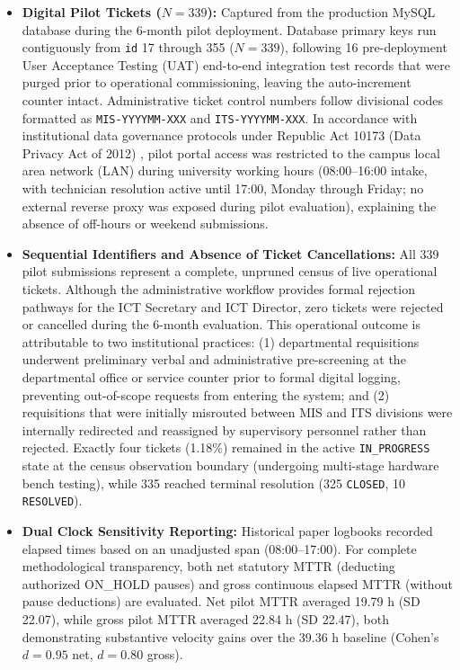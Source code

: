 \documentclass[conference]{IEEEtran}
\begin{document}
\begin{itemize}
    \item \textbf{Digital Pilot Tickets ($N = 339$):} Captured from the production MySQL database during the 6-month pilot deployment. Database primary keys run contiguously from \texttt{id} 17 through 355 ($N=339$), following 16 pre-deployment User Acceptance Testing (UAT) end-to-end integration test records that were purged prior to operational commissioning, leaving the auto-increment counter intact. Administrative ticket control numbers follow divisional codes formatted as \texttt{MIS-YYYYMM-XXX} and \texttt{ITS-YYYYMM-XXX}. In accordance with institutional data governance protocols under Republic Act 10173 (Data Privacy Act of 2012) \cite{ref28}, pilot portal access was restricted to the campus local area network (LAN) during university working hours (08:00--16:00 intake, with technician resolution active until 17:00, Monday through Friday; no external reverse proxy was exposed during pilot evaluation), explaining the absence of off-hours or weekend submissions.
    \item \textbf{Sequential Identifiers and Absence of Ticket Cancellations:} All 339 pilot submissions represent a complete, unpruned census of live operational tickets. Although the administrative workflow provides formal rejection pathways for the ICT Secretary and ICT Director, zero tickets were rejected or cancelled during the 6-month evaluation. This operational outcome is attributable to two institutional practices: (1) departmental requisitions underwent preliminary verbal and administrative pre-screening at the departmental office or service counter prior to formal digital logging, preventing out-of-scope requests from entering the system; and (2) requisitions that were initially misrouted between MIS and ITS divisions were internally redirected and reassigned by supervisory personnel rather than rejected. Exactly four tickets (1.18\%) remained in the active \texttt{IN\_PROGRESS} state at the census observation boundary (undergoing multi-stage hardware bench testing), while 335 reached terminal resolution (325 \texttt{CLOSED}, 10 \texttt{RESOLVED}).
    \item \textbf{Dual Clock Sensitivity Reporting:} Historical paper logbooks recorded elapsed times based on an unadjusted span (08:00--17:00). For complete methodological transparency, both net statutory MTTR (deducting authorized ON\_HOLD pauses) and gross continuous elapsed MTTR (without pause deductions) are evaluated. Net pilot MTTR averaged 19.79 h (SD 22.07), while gross pilot MTTR averaged 22.84 h (SD 22.47), both demonstrating substantive velocity gains over the 39.36 h baseline (Cohen's $d = 0.95$ net, $d = 0.80$ gross).


\end{itemize}
\end{document}
